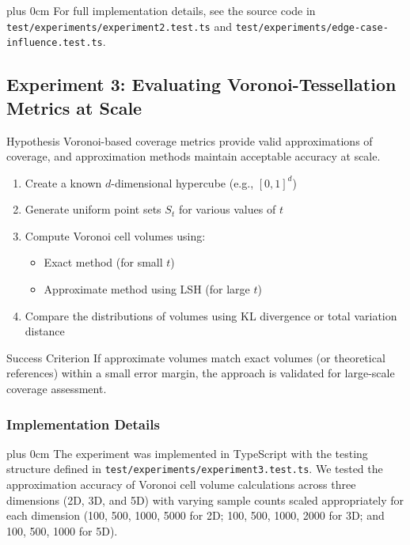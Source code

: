 \documentclass[11pt,a4paper]{article}
\newcommand{\justifytext}{\leftskip=0pt \rightskip=0pt plus 0cm}
\begin{document}
\justifytext
For full implementation details, see the source code in \texttt{test/experiments/experiment2.test.ts} and \texttt{test/experiments/edge-case-influence.test.ts}.

\subsection{Experiment 3: Evaluating Voronoi-Tessellation Metrics at Scale}

\begin{theorembox}{Hypothesis}
Voronoi-based coverage metrics provide valid approximations of coverage, and approximation methods maintain acceptable accuracy at scale.
\end{theorembox}

\begin{tcolorbox}[
  colback=blue!5!white,
  colframe=blue!75!black,
  title=Experimental Design,
  fonttitle=\bfseries
]
\begin{enumerate}
\item Create a known $d$-dimensional hypercube (e.g., $[0,1]^d$)
\item Generate uniform point sets $S_t$ for various values of $t$
\item Compute Voronoi cell volumes using:
   \begin{itemize}
   \item Exact method (for small $t$)
   \item Approximate method using LSH (for large $t$)
   \end{itemize}
\item Compare the distributions of volumes using KL divergence or total variation distance
\end{enumerate}
\end{tcolorbox}

\begin{definitionbox}{Success Criterion}
If approximate volumes match exact volumes (or theoretical references) within a small error margin, the approach is validated for large-scale coverage assessment.
\end{definitionbox}

\subsubsection{Implementation Details}

\justifytext
The experiment was implemented in TypeScript with the testing structure defined in \texttt{test/experiments/experiment3.test.ts}. We tested the approximation accuracy of Voronoi cell volume calculations across three dimensions (2D, 3D, and 5D) with varying sample counts scaled appropriately for each dimension (100, 500, 1000, 5000 for 2D; 100, 500, 1000, 2000 for 3D; and 100, 500, 1000 for 5D).
\end{document}
